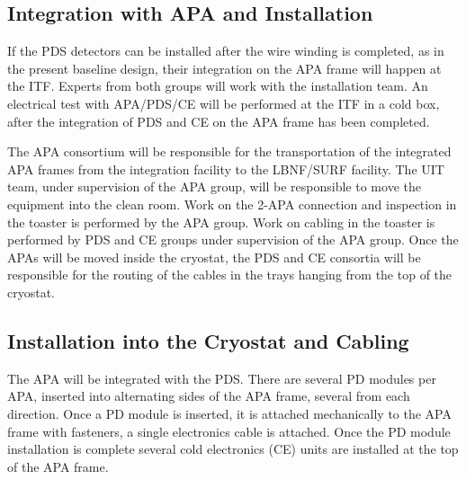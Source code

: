 \subsection{Integration with APA and Installation}
\label{sec:fdsp-pd-install-pd-apa}


If the PDS detectors can be installed after the wire winding is completed, as in the present baseline design, their integration on the APA frame will happen at the ITF. Experts from both groups will work with the installation team. 
An electrical test with APA/PDS/CE will be performed at the ITF in a cold box, after the integration of PDS and CE on the APA frame has been completed.

The APA consortium will be responsible for the transportation of the integrated APA frames from the integration facility to the LBNF/SURF facility. 
The UIT team, under supervision of the APA group, will be responsible to move the equipment into the clean room. 
Work on the 2-APA connection and inspection in the toaster is performed by the APA group.
Work on cabling in the toaster is performed by PDS and CE groups under supervision of the APA group.
Once the APAs will be moved inside the cryostat, the PDS and CE consortia will be responsible for the routing of the cables in the trays hanging from the top of the cryostat. 


\subsection{Installation into the Cryostat and Cabling}
\label{sec:fdsp-pd-install-pd-cryo}

The APA will be integrated with the PDS. There are several PD modules per APA, inserted into alternating sides of the APA frame, several from each direction. Once a PD module is inserted, it is attached mechanically to the APA frame with fasteners, a single electronics cable is attached. Once the PD module installation is complete several cold electronics (CE) units are installed at the top of the APA frame.

